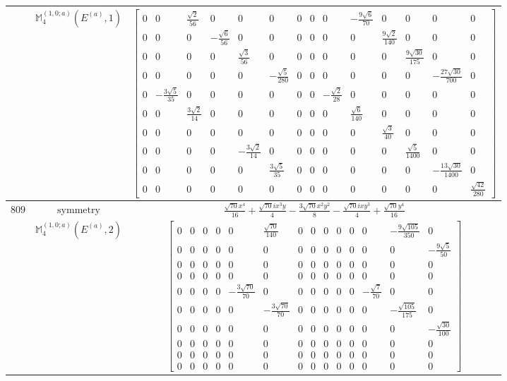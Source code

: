 \documentclass[fleqn,8pt,landscape]{jsarticle}
\begin{document}
\begin{longtable}{ccc}
$  $ & $ \mathbb{M}_{4}^{(1,0;a)}(E^{(a)},1) $ & $ \begin{bmatrix} 0 & 0 & \frac{\sqrt{2}}{56} & 0 & 0 & 0 & 0 & 0 & 0 & - \frac{9 \sqrt{6}}{70} & 0 & 0 & 0 & 0 \\ 0 & 0 & 0 & - \frac{\sqrt{6}}{56} & 0 & 0 & 0 & 0 & 0 & 0 & \frac{9 \sqrt{2}}{140} & 0 & 0 & 0 \\ 0 & 0 & 0 & 0 & \frac{\sqrt{3}}{56} & 0 & 0 & 0 & 0 & 0 & 0 & \frac{9 \sqrt{30}}{175} & 0 & 0 \\ 0 & 0 & 0 & 0 & 0 & - \frac{\sqrt{5}}{280} & 0 & 0 & 0 & 0 & 0 & 0 & - \frac{27 \sqrt{30}}{700} & 0 \\ 0 & - \frac{3 \sqrt{5}}{35} & 0 & 0 & 0 & 0 & 0 & 0 & - \frac{\sqrt{2}}{28} & 0 & 0 & 0 & 0 & 0 \\ 0 & 0 & \frac{3 \sqrt{2}}{14} & 0 & 0 & 0 & 0 & 0 & 0 & \frac{\sqrt{6}}{140} & 0 & 0 & 0 & 0 \\ 0 & 0 & 0 & 0 & 0 & 0 & 0 & 0 & 0 & 0 & \frac{\sqrt{3}}{40} & 0 & 0 & 0 \\ 0 & 0 & 0 & 0 & - \frac{3 \sqrt{2}}{14} & 0 & 0 & 0 & 0 & 0 & 0 & \frac{\sqrt{5}}{1400} & 0 & 0 \\ 0 & 0 & 0 & 0 & 0 & \frac{3 \sqrt{5}}{35} & 0 & 0 & 0 & 0 & 0 & 0 & - \frac{13 \sqrt{30}}{1400} & 0 \\ 0 & 0 & 0 & 0 & 0 & 0 & 0 & 0 & 0 & 0 & 0 & 0 & 0 & \frac{\sqrt{42}}{280} \end{bmatrix} $ \\ \hline
$ 809 $ & $ \text{symmetry} $ & $ \frac{\sqrt{70} x^{4}}{16} + \frac{\sqrt{70} i x^{3} y}{4} - \frac{3 \sqrt{70} x^{2} y^{2}}{8} - \frac{\sqrt{70} i x y^{3}}{4} + \frac{\sqrt{70} y^{4}}{16} $ \\
$  $ & $ \mathbb{M}_{4}^{(1,0;a)}(E^{(a)},2) $ & $ \begin{bmatrix} 0 & 0 & 0 & 0 & 0 & \frac{\sqrt{70}}{140} & 0 & 0 & 0 & 0 & 0 & 0 & - \frac{9 \sqrt{105}}{350} & 0 \\ 0 & 0 & 0 & 0 & 0 & 0 & 0 & 0 & 0 & 0 & 0 & 0 & 0 & - \frac{9 \sqrt{5}}{50} \\ 0 & 0 & 0 & 0 & 0 & 0 & 0 & 0 & 0 & 0 & 0 & 0 & 0 & 0 \\ 0 & 0 & 0 & 0 & 0 & 0 & 0 & 0 & 0 & 0 & 0 & 0 & 0 & 0 \\ 0 & 0 & 0 & 0 & - \frac{3 \sqrt{70}}{70} & 0 & 0 & 0 & 0 & 0 & 0 & - \frac{\sqrt{7}}{70} & 0 & 0 \\ 0 & 0 & 0 & 0 & 0 & - \frac{3 \sqrt{70}}{70} & 0 & 0 & 0 & 0 & 0 & 0 & - \frac{\sqrt{105}}{175} & 0 \\ 0 & 0 & 0 & 0 & 0 & 0 & 0 & 0 & 0 & 0 & 0 & 0 & 0 & - \frac{\sqrt{30}}{100} \\ 0 & 0 & 0 & 0 & 0 & 0 & 0 & 0 & 0 & 0 & 0 & 0 & 0 & 0 \\ 0 & 0 & 0 & 0 & 0 & 0 & 0 & 0 & 0 & 0 & 0 & 0 & 0 & 0 \\ 0 & 0 & 0 & 0 & 0 & 0 & 0 & 0 & 0 & 0 & 0 & 0 & 0 & 0 \end{bmatrix} $ \\ \hline

\end{longtable}
\end{document}
